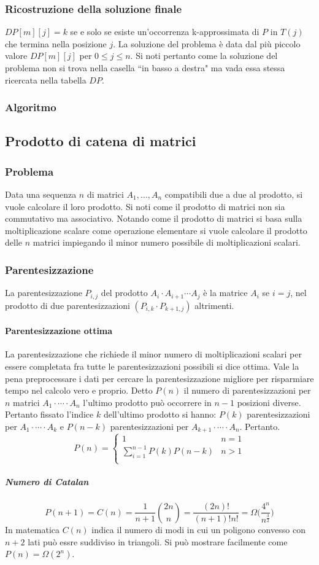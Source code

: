 \subsubsection{Ricostruzione della soluzione finale}
$DP[m][j] = k$ se e solo se esiste un'occorrenza k-approssimata di $P$ in $T(j)$ che termina nella posizione $j$. La soluzione del problema \`e data dal pi\`u piccolo valore  $DP[m][j]$ 
per $0\le j\le n$. Si noti pertanto come la soluzione del problema non si trova nella casella ``in basso a destra" ma vada essa stessa ricercata nella tabella $DP$.
\subsubsection{Algoritmo}

\subsection{Prodotto di catena di matrici}
\subsubsection{Problema}
Data una sequenza $n$ di matrici $A_1, \dots, A_n$ compatibili due a due al prodotto, si vuole calcolare il loro prodotto. Si noti come il prodotto di 
matrici non sia commutativo ma associativo. Notando come il prodotto di matrici si basa sulla moltiplicazione scalare come operazione elementare si vuole
calcolare il prodotto delle $n$ matrici impiegando il minor numero possibile di moltiplicazioni scalari. 
\subsubsection{Parentesizzazione}
La parentesizzazione $P_{i, j}$ del prodotto $A_i\cdot A_{i+1}\cdots A_j$ \`e la matrice $A_i$ se $i=j$, nel prodotto di due parentesizzazioni $(P_{i,k}
\cdot P_{k+1, j})$ altrimenti. 
\paragraph{Parentesizzazione ottima}
La parentesizzazione che richiede il minor numero di moltiplicazioni scalari per essere completata fra tutte le parentesizzazioni possibili si dice 
ottima. Vale la pena preprocessare i dati per cercare la parentesizzazione migliore per risparmiare tempo nel calcolo vero e proprio. Detto $P(n)$ il
numero di parentesizzazioni per $n$ matrici $A_1\cdot\cdots\cdot A_n$ l'ultimo prodotto pu\`o occorrere in $n-1$ posizioni diverse. Pertanto fissato 
l'indice $k$ dell'ultimo prodotto si hanno: $P(k)$ parentesizzazioni per $A_1\cdot\cdots\cdot A_k$ e $P(n-k)$ parentesizzazioni per  $A_{k+1}\cdot\cdots
\cdot A_n$. Pertanto.
$$P(n) = 
\begin{cases}
	1 & n =1 \\
	\sum\limits_{i = 1}^{n-1} P(k)P(n-k) & n > 1\\
\end{cases}$$
\subparagraph{Numero di Catalan}
$$P(n+1) = C(n) = \dfrac{1}{n+1}\binom{2n}{n} = \dfrac{(2n)!}{(n+1)!n!} = \Omega\biggl(\dfrac{4^n}{n^{\frac{3}{2}}}\biggr)$$
In matematica $C(n)$ indica il numero di modi in cui un poligono convesso con $n+2$ lati pu\`o essre suddiviso in triangoli. Si pu\`o mostrare facilmente
come $P(n)=\Omega(2^n)$. 

